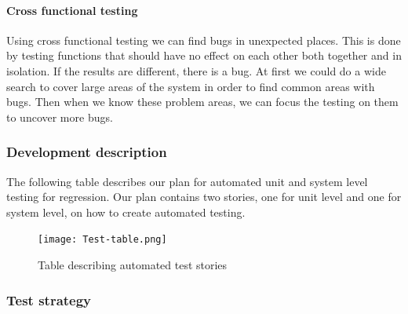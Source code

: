 \documentclass{article}
\begin{document}
\paragraph{Cross functional testing}
Using cross functional testing we can find bugs in unexpected places. This is done by testing functions that should have no effect on each other both together and in isolation. If the results are different, there is a bug. At first we could do a wide search to cover large areas of the system in order to find common areas with bugs. Then when we know these problem areas, we can focus the testing on them to uncover more bugs. 

\newpage
\subsubsection{Development description}

The following table describes our plan for automated unit and system level testing for regression. Our plan contains two stories, one for unit level and one for system level, on how to create automated testing.

\begin{figure}[H]
    \begin{center}
        \texttt{[image: Test-table.png]}
        \caption{Table describing automated test stories}
        \label{test-strat}
    \end{center}
\end{figure}

\subsubsection{Test strategy}
\end{document}
